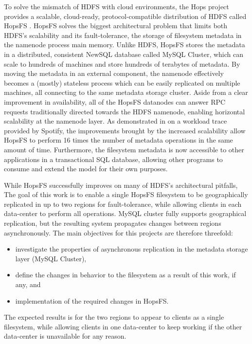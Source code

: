 To solve the mismatch of HDFS with cloud environments, the Hops project provides a scalable, cloud-ready, protocol-compatible distribution of HDFS called HopsFS \cite{DBLP:conf/dais/NiaziIBD15}.
HopsFS solves the biggest architectural problem that limits both HDFS's scalability and its fault-tolerance, the storage of filesystem metadata in the namenode process main memory.
Unlike HDFS, HopsFS stores the metadata in a distributed, consistent NewSQL database called MySQL Cluster, which can scale to hundreds of machines and store hundreds of terabytes of metadata.
By moving the metadata in an external component, the namenode effectively becomes a (mostly) stateless process which can be easily replicated on multiple machines, all connecting to the same metadata storage cluster.
Aside from a clear improvement in availability, all of the HopsFS datanodes can answer RPC requests traditionally directed towards the HDFS namenode, enabling horizontal scalability at the namenode layer.
As demonstrated in \cite{DBLP:conf/dais/NiaziIBD15} on a workload trace provided by Spotify, the improvements brought by the increased scalability allow HopsFS to perform 16 times the number of metadata operations in the same amount of time.
Furthermore, the filesystem metadata is now accessible to other applications in a transactional SQL database, allowing other programs to consume and extend the model for their own purposes.

While HopsFS successfully improves on many of HDFS's architectural pitfalls, 
The goal of this work is to enable a single HopsFS filesystem to be geographically replicated in up to two regions for fault-tolerance, while allowing clients in each data-center to perform all operations.
MySQL cluster fully supports geographical replication, but the resulting system propagates changes between regions asynchronously.
The main objectives for this projects are therefore threefold:
\begin{itemize}
    \item investigate the properties of asynchronous replication in the metadata storage layer (MySQL Cluster),
    \item define the changes in behavior to the filesystem as a result of this work, if any, and
    \item implementation of the required changes in HopsFS.
\end{itemize}
The expected results is for the two regions to appear to clients as a single filesystem, while allowing clients in one data-center to keep working if the other data-center is unavailable for any reason.

